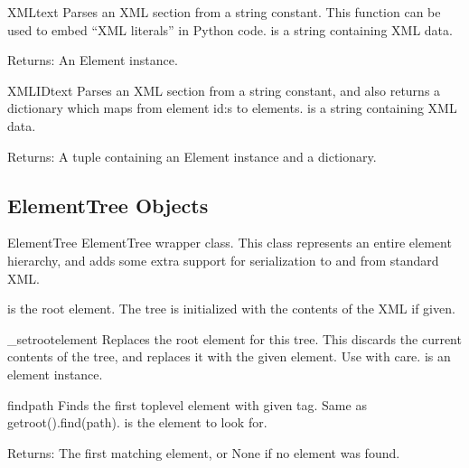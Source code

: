 \begin{funcdesc}{XML}{text}
Parses an XML section from a string constant.  This function can
be used to embed ``XML literals'' in Python code.
 is a string containing XML data.

\begin{datadescni}{Returns:}
An Element instance.
\end{datadescni}
\end{funcdesc}

\begin{funcdesc}{XMLID}{text}
Parses an XML section from a string constant, and also returns
a dictionary which maps from element id:s to elements.
 is a string containing XML data.

\begin{datadescni}{Returns:}
A tuple containing an Element instance and a dictionary.
\end{datadescni}
\end{funcdesc}


\subsection{ElementTree Objects\label{elementtree-elementtree-objects}}

\begin{classdesc}{ElementTree}{ }
ElementTree wrapper class.  This class represents an entire element
hierarchy, and adds some extra support for serialization to and from
standard XML.

 is the root element.
The tree is initialized with the contents of the XML  if given.
\end{classdesc}

\begin{methoddesc}{_setroot}{element}
Replaces the root element for this tree.  This discards the
current contents of the tree, and replaces it with the given
element.  Use with care.
 is an element instance.
\end{methoddesc}

\begin{methoddesc}{find}{path}
Finds the first toplevel element with given tag.
Same as getroot().find(path).
 is the element to look for.

\begin{datadescni}{Returns:}
The first matching element, or None if no element was found.
\end{datadescni}
\end{methoddesc}

